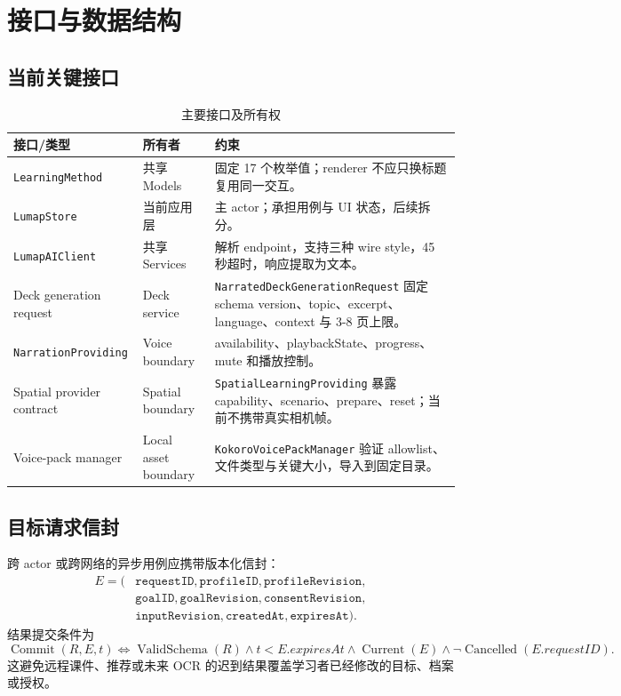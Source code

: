 \documentclass[11pt,a4paper,fontset=none]{ctexart}
\newcommand{\code}[1]{\begingroup\urlstyle{tt}\nolinkurl{#1}\endgroup}
\begin{document}
\section{接口与数据结构}

\subsection{当前关键接口}
\begin{table}[htbp]
\centering
\small
\caption{主要接口及所有权}
\begin{tabularx}{\textwidth}{P{37mm}P{40mm}Y}
\toprule
接口/类型 & 所有者 & 约束 \\
\midrule
\code{LearningMethod} & 共享 Models & 固定 17 个枚举值；renderer 不应只换标题复用同一交互。 \\
\code{LumapStore} & 当前应用层 & 主 actor；承担用例与 UI 状态，后续拆分。 \\
\code{LumapAIClient} & 共享 Services & 解析 endpoint，支持三种 wire style，45 秒超时，响应提取为文本。 \\
Deck generation request & Deck service & \code{NarratedDeckGenerationRequest} 固定 schema version、topic、excerpt、language、context 与 3-8 页上限。 \\
\code{NarrationProviding} & Voice boundary & availability、playbackState、progress、mute 和播放控制。 \\
Spatial provider contract & Spatial boundary & \code{SpatialLearningProviding} 暴露 capability、scenario、prepare、reset；当前不携带真实相机帧。 \\
Voice-pack manager & Local asset boundary & \code{KokoroVoicePackManager} 验证 allowlist、文件类型与关键大小，导入到固定目录。 \\
\bottomrule
\end{tabularx}
\end{table}

\subsection{目标请求信封}
跨 actor 或跨网络的异步用例应携带版本化信封：
\begin{equation}
\begin{aligned}
  E = (&\texttt{requestID},\texttt{profileID},\texttt{profileRevision},\\
       &\texttt{goalID},\texttt{goalRevision},\texttt{consentRevision},\\
       &\texttt{inputRevision},\texttt{createdAt},\texttt{expiresAt}).
\end{aligned}
\end{equation}
结果提交条件为
\begin{equation}
  \operatorname{Commit}(R,E,t)
  \iff \operatorname{ValidSchema}(R)
  \land t<E.expiresAt
  \land \operatorname{Current}(E)
  \land \neg\operatorname{Cancelled}(E.requestID).
\end{equation}
这避免远程课件、推荐或未来 OCR 的迟到结果覆盖学习者已经修改的目标、档案或授权。
\end{document}
